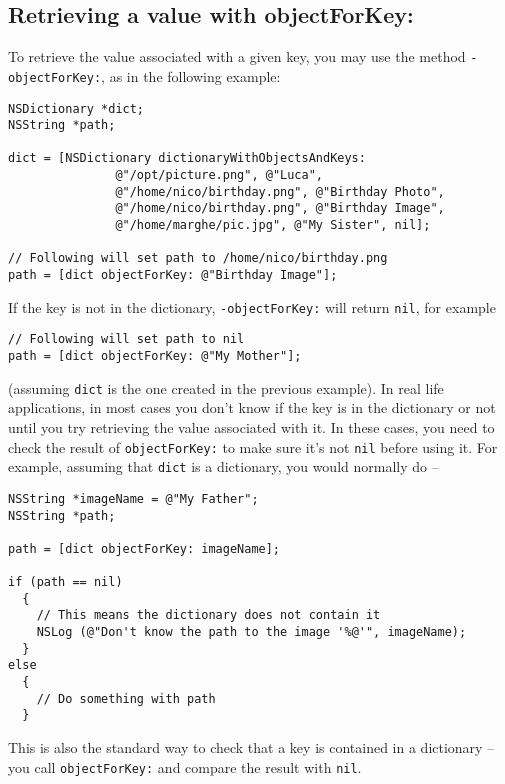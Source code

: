 \documentclass[a4paper]{article}
\begin{document}
\subsection{Retrieving a value with objectForKey:}
To retrieve the value associated with a given key, you may 
use the method \texttt{-objectForKey:}, as in the following 
example: 
\begin{verbatim}
NSDictionary *dict;
NSString *path;

dict = [NSDictionary dictionaryWithObjectsAndKeys:
               @"/opt/picture.png", @"Luca", 
               @"/home/nico/birthday.png", @"Birthday Photo", 
               @"/home/nico/birthday.png", @"Birthday Image", 
               @"/home/marghe/pic.jpg", @"My Sister", nil];

// Following will set path to /home/nico/birthday.png
path = [dict objectForKey: @"Birthday Image"]; 
\end{verbatim}
If the key is not in the dictionary, \texttt{-objectForKey:} will return 
\texttt{nil}, for example
\begin{verbatim}
// Following will set path to nil
path = [dict objectForKey: @"My Mother"]; 
\end{verbatim}
(assuming \texttt{dict} is the one created in the previous example).
In real life applications, in most cases you don't know if the key is
in the dictionary or not until you try retrieving the value associated
with it.  In these cases, you need to check the result of
\texttt{objectForKey:} to make sure it's not \texttt{nil} before using 
it.  For example, assuming that \texttt{dict} is a dictionary, you
would normally do --
\begin{verbatim}
NSString *imageName = @"My Father";
NSString *path;

path = [dict objectForKey: imageName];

if (path == nil)
  {
    // This means the dictionary does not contain it
    NSLog (@"Don't know the path to the image '%@'", imageName);
  }
else
  {
    // Do something with path
  }
\end{verbatim}
This is also the standard way to check that a key is contained in a
dictionary -- you call \texttt{objectForKey:} and compare the result
with \texttt{nil}.
\end{document}
